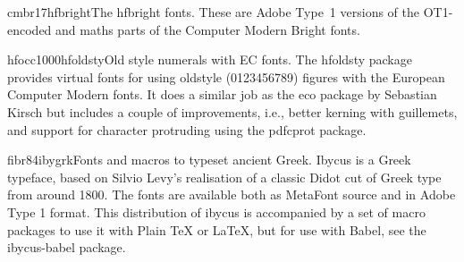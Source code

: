 \documentclass{ddltxtyp}
\begin{document}
\begin{package}{cmbr17}{hfbright}{The hfbright fonts.}
These are Adobe Type~1 versions of the OT1-encoded and maths
parts of the Computer Modern Bright fonts.
\end{package}

\begin{package}{hfocc1000}{hfoldsty}{Old style numerals with EC fonts.}
The hfoldsty package provides virtual fonts for using oldstyle
(0123456789) figures with the European Computer Modern fonts.
It does a similar job as the eco package by Sebastian Kirsch
but includes a couple of improvements, i.e., better kerning
with guillemets, and support for character protruding using the
pdfcprot package.
\end{package}

\begin{package}{fibr84}{ibygrk}{Fonts and macros to typeset ancient Greek.}
Ibycus is a Greek typeface, based on Silvio Levy's realisation
of a classic Didot cut of Greek type from around 1800. The
fonts are available both as MetaFont source and in Adobe Type 1
format. This distribution of ibycus is accompanied by a set of
macro packages to use it with Plain TeX or LaTeX, but for use
with Babel, see the ibycus-babel package.
\end{package}

\end{document}
